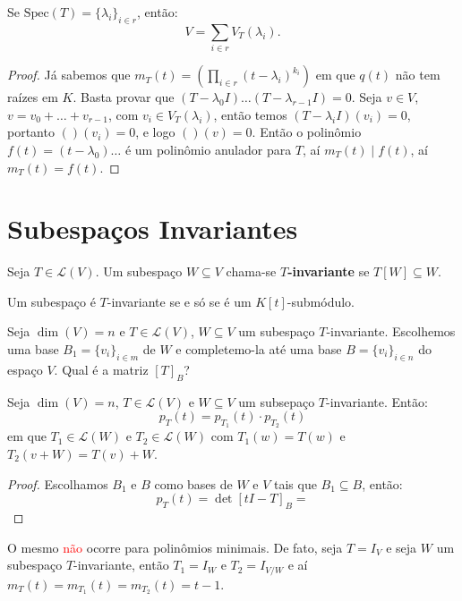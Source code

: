 \documentclass[11pt,twoside,a4paper]{book}
\begin{document}
\noindent
Se $\mathrm{Spec}(T)=\{\lambda_i\}_{i\in r}$, então:
\[
V=\sum_{i\in r}V_T(\lambda_i).
\]

\begin{proof}
Já sabemos que $m_T(t)=\left(\prod_{i\in r}(t-\lambda_i)^{k_i}\right)$ em que $q(t)$ não tem raízes em $K$. Basta provar que $(T-\lambda_0 I)\dots(T-\lambda_{r-1} I)=0$. Seja $v\in V$, $v=v_0+\dots+v_{r-1}$, com $v_i\in V_T(\lambda_i)$, então temos $(T-\lambda_i I)(v_i)=0$, portanto $()(v_i)=0$, e logo $()(v)=0$. Então o polinômio $f(t)=(t-\lambda_0)\dots$ é um polinômio anulador para $T$, aí $m_T(t)\mid f(t)$, aí $m_T(t)=f(t)$.
\end{proof}

\section{Subespaços Invariantes}

\begin{definicao}
Seja $T\in\mathcal{L}(V)$. Um subespaço $W\subseteq V$ chama-se \textbf{$T$-invariante} se $T[W]\subseteq W$.
\end{definicao}

\begin{observacao}
Um subespaço é $T$-invariante se e só se é um $K[t]$-submódulo.
\end{observacao}

\noindent
Seja $\dim(V)=n$ e $T\in\mathcal{L}(V)$, $W\subseteq V$ um subespaço $T$-invariante. Escolhemos uma base $B_1=\{v_i\}_{i\in m}$ de $W$ e completemo-la até uma base $B=\{v_i\}_{i\in n}$ do espaço $V$. Qual é a matriz $[T]_B$?

\begin{lema}
Seja $\dim(V)=n$, $T\in\mathcal{L}(V)$ e $W\subseteq V$ um subsepaço $T$-invariante. Então:
\[
p_T(t)=p_{T_1}(t)\cdot p_{T_2}(t)
\]
em que $T_1\in\mathcal{L}(W)$ e $T_2\in\mathcal{L}(W)$ com $T_1(w)=T(w)$ e $T_2(v+W)=T(v)+W$.
\end{lema}
\begin{proof}
Escolhamos $B_1$ e $B$ como bases de $W$ e $V$ tais que $B_1\subseteq B$, então:
\[
p_T(t)=\det[tI-T]_B=
\]
\end{proof}

\begin{observacao}
O mesmo \textcolor{red}{não} ocorre para polinômios minimais. De fato, seja $T=I_V$ e seja $W$ um subespaço $T$-invariante, então $T_1=I_W$ e $T_2=I_{V/W}$ e aí $m_T(t)=m_{T_1}(t)=m_{T_2}(t)=t-1$.

\end{observacao}

\printindex
\end{document}
